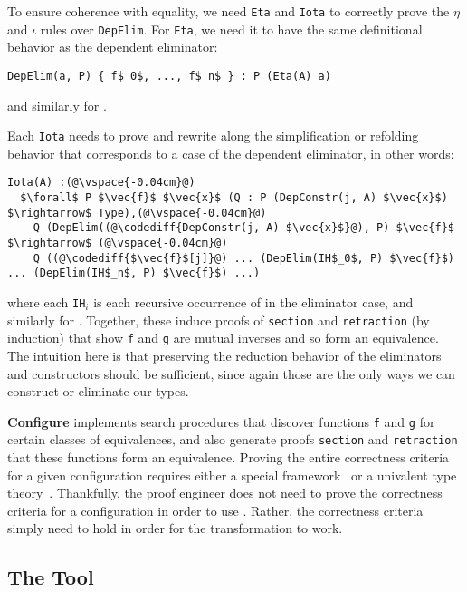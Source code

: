 To ensure coherence with equality, we need \lstinline{Eta} and \lstinline{Iota} to correctly prove the $\eta$ and $\iota$ rules
over \lstinline{DepElim}.
For \lstinline{Eta}, we need it to have the same definitional behavior as the dependent eliminator:

\begin{lstlisting}
DepElim(a, P) { f$_0$, ..., f$_n$ } : P (Eta(A) a)
\end{lstlisting}
and similarly for \B.

Each \lstinline{Iota} needs to prove and rewrite along the simplification or refolding behavior that corresponds to a case of the dependent eliminator, in other words: %

\begin{lstlisting}
Iota(A) :(@\vspace{-0.04cm}@)
  $\forall$ P $\vec{f}$ $\vec{x}$ (Q : P (DepConstr(j, A) $\vec{x}$) $\rightarrow$ Type),(@\vspace{-0.04cm}@)
    Q (DepElim((@\codediff{DepConstr(j, A) $\vec{x}$}@), P) $\vec{f}$ $\rightarrow$ (@\vspace{-0.04cm}@)
    Q ((@\codediff{$\vec{f}$[j]}@) ... (DepElim(IH$_0$, P) $\vec{f}$) ... (DepElim(IH$_n$, P) $\vec{f}$) ...)
\end{lstlisting}
where each \lstinline{IH}$_i$ is each recursive occurrence of \A in the eliminator case,
and similarly for \B.
Together, these induce proofs of \lstinline{section} and \lstinline{retraction} (by induction) that show \lstinline{f} and \lstinline{g}
are mutual inverses and so form an equivalence.
The intuition here is that preserving the reduction behavior
of the eliminators and constructors should be sufficient, since again those are the only ways we can construct or eliminate our types.

\textbf{Configure} implements search procedures that discover functions \lstinline{f} and \lstinline{g} for certain classes of
equivalences, and also
generate proofs \lstinline{section} and \lstinline{retraction} that these functions form an equivalence.
Proving the entire correctness criteria for a given configuration requires either a special framework~\cite{tabareau2017equivalences}
or a univalent type theory~\cite{univalent2013homotopy}.
Thankfully, the proof engineer does not need to prove the correctness criteria for a configuration in order to use \toolname.
Rather, the correctness criteria simply need to hold in order for the transformation to work.

\subsection{The Tool}
\label{sec:implementation}

